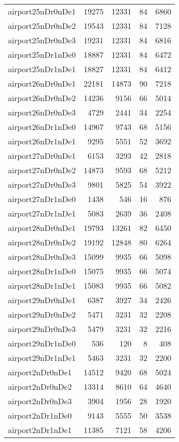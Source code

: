 \begin{longtable}{lrrrr}
airport25nDr0nDe1 & 19275 & 12331 & 84 & 6860 \\
airport25nDr0nDe2 & 19543 & 12331 & 84 & 7128 \\
airport25nDr0nDe3 & 19231 & 12331 & 84 & 6816 \\
airport25nDr1nDe0 & 18887 & 12331 & 84 & 6472 \\
airport25nDr1nDe1 & 18827 & 12331 & 84 & 6412 \\
airport26nDr0nDe1 & 22181 & 14873 & 90 & 7218 \\
airport26nDr0nDe2 & 14236 & 9156 & 66 & 5014 \\
airport26nDr0nDe3 & 4729 & 2441 & 34 & 2254 \\
airport26nDr1nDe0 & 14967 & 9743 & 68 & 5156 \\
airport26nDr1nDe1 & 9295 & 5551 & 52 & 3692 \\
airport27nDr0nDe1 & 6153 & 3293 & 42 & 2818 \\
airport27nDr0nDe2 & 14873 & 9593 & 68 & 5212 \\
airport27nDr0nDe3 & 9801 & 5825 & 54 & 3922 \\
airport27nDr1nDe0 & 1438 & 546 & 16 & 876 \\
airport27nDr1nDe1 & 5083 & 2639 & 36 & 2408 \\
airport28nDr0nDe1 & 19793 & 13261 & 82 & 6450 \\
airport28nDr0nDe2 & 19192 & 12848 & 80 & 6264 \\
airport28nDr0nDe3 & 15099 & 9935 & 66 & 5098 \\
airport28nDr1nDe0 & 15075 & 9935 & 66 & 5074 \\
airport28nDr1nDe1 & 15083 & 9935 & 66 & 5082 \\
airport29nDr0nDe1 & 6387 & 3927 & 34 & 2426 \\
airport29nDr0nDe2 & 5471 & 3231 & 32 & 2208 \\
airport29nDr0nDe3 & 5479 & 3231 & 32 & 2216 \\
airport29nDr1nDe0 & 536 & 120 & 8 & 408 \\
airport29nDr1nDe1 & 5463 & 3231 & 32 & 2200 \\
airport2nDr0nDe1 & 14512 & 9420 & 68 & 5024 \\
airport2nDr0nDe2 & 13314 & 8610 & 64 & 4640 \\
airport2nDr0nDe3 & 3904 & 1956 & 28 & 1920 \\
airport2nDr1nDe0 & 9143 & 5555 & 50 & 3538 \\
airport2nDr1nDe1 & 11385 & 7121 & 58 & 4206 \\

\end{longtable}
